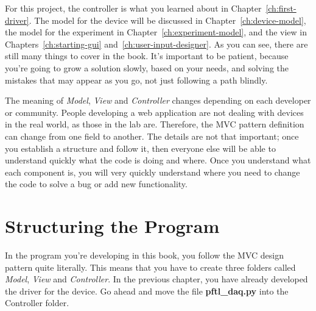For this project, the controller is what you learned about in Chapter~\ref{ch:first-driver}. The model for the device will be discussed in Chapter~\ref{ch:device-model}, the model for the experiment in Chapter~\ref{ch:experiment-model}, and the view in Chapters~\ref{ch:starting-gui} and~\ref{ch:user-input-designer}. As you can see, there are still many things to cover in the book. It's important to be patient, because you're going to grow a solution slowly, based on your needs, and solving the mistakes that may appear as you go, not just following a path blindly.


The meaning of \emph{Model}, \emph{View} and \emph{Controller} changes depending on each developer or community. People developing a web application are not dealing with devices in the real world, as those in the lab are. Therefore, the {MVC} pattern definition can change from one field to another. The details are not that important; once you establish a structure and follow it, then everyone else will be able to understand quickly what the code is doing and where. Once you understand what each component is, you will very quickly understand where you need to change the code to solve a bug or add new functionality.

\section{Structuring the Program}\label{sec:structure-of-theprogram}
In the program you're developing in this book, you follow the MVC design pattern quite literally. This means that you have to create three folders called \emph{Model}, \emph{View} and \emph{Controller}. In the previous chapter, you have already developed the driver for the device. Go ahead and move the file \textbf{pftl\_daq.py} into the Controller folder.

